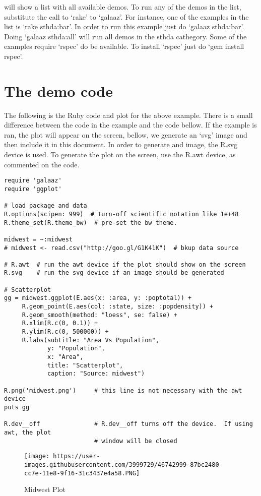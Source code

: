 \documentclass[]{article}
\begin{document}
will show a list with all available demos. To run any of the demos in
the list, substitute the call to `rake' to `galaaz'. For instance, one
of the examples in the list is `rake sthda:bar'. In order to run this
example just do `galaaz sthda:bar'. Doing `galaaz sthda:all' will run
all demos in the sthda cathegory. Some of the examples require `rspec'
do be available. To install `rspec' just do `gem install rspec'.

\section{The demo code}\label{the-demo-code}

The following is the Ruby code and plot for the above example. There is
a small difference between the code in the example and the code bellow.
If the example is ran, the plot will appear on the screen, bellow, we
generate an `svg' image and then include it in this document. In order
to generate and image, the R.svg device is used. To generate the plot on
the screen, use the R.awt device, as commented on the code.

\begin{verbatim}
require 'galaaz'
require 'ggplot'

# load package and data
R.options(scipen: 999)  # turn-off scientific notation like 1e+48
R.theme_set(R.theme_bw)  # pre-set the bw theme.

midwest = ~:midwest
# midwest <- read.csv("http://goo.gl/G1K41K")  # bkup data source

# R.awt  # run the awt device if the plot should show on the screen
R.svg    # run the svg device if an image should be generated

# Scatterplot
gg = midwest.ggplot(E.aes(x: :area, y: :poptotal)) + 
     R.geom_point(E.aes(col: :state, size: :popdensity)) + 
     R.geom_smooth(method: "loess", se: false) + 
     R.xlim(R.c(0, 0.1)) + 
     R.ylim(R.c(0, 500000)) + 
     R.labs(subtitle: "Area Vs Population", 
            y: "Population", 
            x: "Area", 
            title: "Scatterplot", 
            caption: "Source: midwest")

R.png('midwest.png')     # this line is not necessary with the awt device
puts gg

R.dev__off               # R.dev__off turns off the device.  If using awt, the plot
                         # window will be closed
\end{verbatim}

\begin{figure}
\centering
\texttt{[image: https://user-images.githubusercontent.com/3999729/46742999-87bc2480-cc7e-11e8-9f16-31c3437e4a58.PNG]}
\caption{Midwest Plot}
\end{figure}
\end{document}

